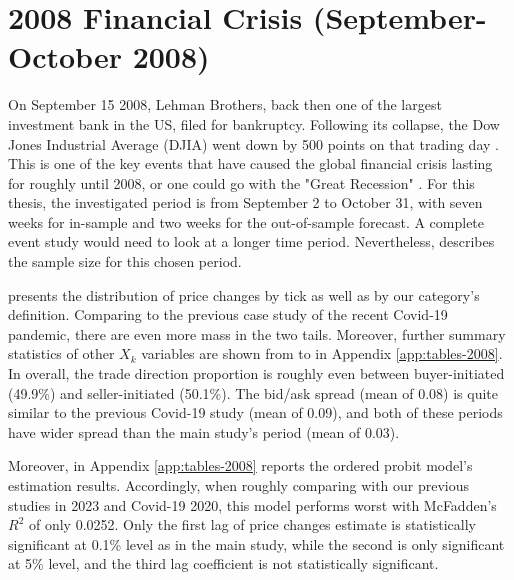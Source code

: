 \clearpage



\section{2008 Financial Crisis (September-October 2008)}

On September 15 2008, Lehman Brothers, back then one of the largest investment bank in the US, filed for bankruptcy. Following its collapse, the Dow Jones Industrial Average (DJIA) went down by 500 points on that trading day \citep{johnson&mamun2012}. This is one of the key events that have caused the global financial crisis lasting for roughly until 2008, or one could go with the "Great Recession" \citep{islam&verick2011}. For this thesis, the investigated period is from September 2 to October 31, with seven weeks for in-sample and two weeks for the out-of-sample forecast. A complete event study would need to look at a longer time period. Nevertheless,  describes the sample size for this chosen period.

 presents the distribution of price changes by tick as well as by our category's definition. Comparing to the previous case study of the recent Covid-19 pandemic, there are even more mass in the two tails. Moreover, further summary statistics of other $X_k$ variables are shown from  to  in Appendix \ref{app:tables-2008}. In overall, the trade direction proportion is roughly even between buyer-initiated (49.9\%) and seller-initiated (50.1\%). The bid/ask spread (mean of 0.08) is quite similar to the previous Covid-19 study (mean of 0.09), and both of these periods have wider spread than the main study's period (mean of 0.03).

Moreover,  in Appendix \ref{app:tables-2008} reports the ordered probit model's estimation results. Accordingly, when roughly comparing with our previous studies in 2023 and Covid-19 2020, this model performs worst with McFadden's $R^2$ of only 0.0252. Only the first lag of price changes estimate is statistically significant at 0.1\% level as in the main study, while the second is only significant at 5\% level, and the third lag coefficient is not statistically significant.


